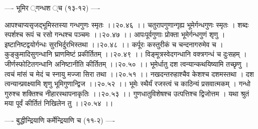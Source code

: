 \documentclass[11pt]{book}
\begin{document}
\begin{landscape}
---- भूमिर{ }्गन्धश{ }्च (१३-१२) ----

आपश्चाप्यसृजद्भूमिस्तस्या गन्धगुणः स्मृतः ।।२०.४६ ।।
चतुरापगुणान्गृह्य भूमेर्गन्धगुणः स्मृतः ।
शब्दः स्पर्शश्च रूपं च रसो गन्धश्च पञ्चमः ।।२०.४७ ।।
आपःपूर्वगुणाः प्रोक्ता भूमेर्गन्धगुणं शृणु ।
इष्टानिष्टद्वयोर्गन्धः सुरभिर्दुरभिस्तथा ।।२०.४८ ।।
कर्पूरः कस्तुरीकं च चन्दनागरुमेव च ।
कुङ्कुमादिसुगन्धानि घ्राणमिष्टं प्रकीर्तितम् ।।२०.४९ ।।
विङ्मूत्रस्वेदगन्धानि वक्त्रगन्धं च दुःसहम् ।
जीर्णस्फोटितगन्धानि अनिष्टानीति कीर्तितम् ।।२०.५० ।।
भूमेर्धातु दश त्वन्यान्कथयिष्यामि तच्छृणु ।
त्वचं मांसं च मेदं च स्नायु मज्जा सिरा तथा ।।२०.५१ ।।
नखदन्तरुहाश्चैव केशश्च दशमस्तथा ।
दश त्वन्यान्प्रवक्ष्यामि शृणु भूमिगुणान्द्विज ।।२०.५२ ।।
भूमेः स्थैर्यं रजस्त्वं च काठिन्यं प्रसवात्मकम् ।
गन्धो गुरुश्च शक्तिश्च नीहारस्थापनाकृतिः ।।२०.५३ ।।
गुणधातुविशेषश्च उत्पत्तिश्च द्विजोत्तम ।
यथा श्रुतं मया पूर्वं कीर्तितं निखिलेन तु ।।२०.५४ ।।

---- बुद्धीन्द्रियाणि कर्मेन्द्रियाणि च (११-२) ----


\end{landscape}
\end{document}
